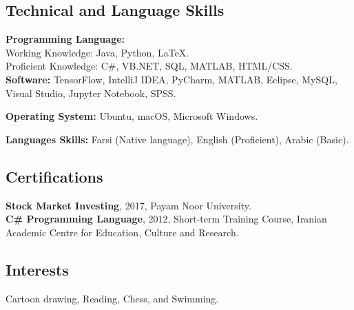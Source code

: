 \documentclass[10pt]{article}
\begin{document}
\subsection*{Technical and Language Skills}

\noindent \textbf{Programming Language:} \\
  \indent Working Knowledge: Java, Python, \LaTeX.\\
  \indent Proficient Knowledge:  C\#, VB.NET, SQL, MATLAB, HTML/CSS.\\
\noindent \textbf{Software:} TensorFlow, IntelliJ IDEA, PyCharm, MATLAB, Eclipse, MySQL, Visual Studio, Jupyter Notebook, SPSS.

\noindent \textbf{Operating System:} Ubuntu, macOS, Microsoft Windows.

\noindent \textbf{Languages Skills: }Farsi (Native language), English (Proficient), Arabic (Basic).

\subsection*{Certifications}
\noindent \textbf{Stock Market Investing}, 2017, Payam Noor University.\\
\noindent \textbf{C\# Programming Language}, 2012, Short-term Training Course, Iranian Academic Centre for Education, Culture and Research.

\subsection*{Interests}
Cartoon drawing, Reading, Chess, and Swimming.
\end{document}
